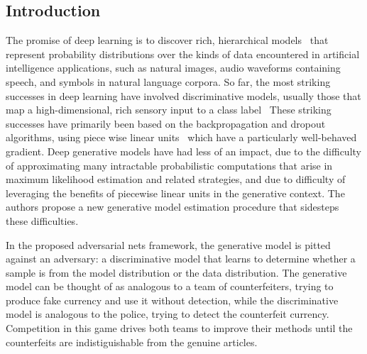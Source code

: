 \documentclass[10pt,twocolumn,letterpaper]{article}
\begin{document}
\subsection{Introduction}
\par The promise of deep learning is to discover rich, hierarchical models~\cite{Bengio2009Learning} that represent probability distributions over the kinds of data encountered in artificial intelligence applications, such as natural images, audio waveforms containing speech, and  symbols in natural language corpora. So far, the most striking successes in deep learning have involved discriminative models, usually those that map a high-dimensional, rich sensory input to a class label~\cite{Hinton2012Deep} These striking successes have primarily been based on the backpropagation and dropout algorithms, using piece wise linear units~\cite{Glorot2011Deep} which have a particularly well-behaved gradient. Deep generative models have had less of an impact, due to the difficulty of approximating many intractable probabilistic computations that arise in maximum likelihood estimation and related strategies, and due to difficulty of leveraging the benefits of piecewise linear units in the generative context. The authors propose a new generative model estimation procedure that sidesteps these difficulties.
\par In the proposed adversarial nets framework, the generative model is pitted against an adversary: a discriminative model that learns to determine whether a sample is from the model distribution or the data distribution. The generative model can be thought of as analogous to a team of counterfeiters, trying to produce fake currency and use it without detection, while the discriminative model is analogous to the police, trying to detect the counterfeit currency. Competition in this game drives both teams to improve their methods until the counterfeits are indistiguishable from the genuine articles.
  
 
\end{document}
